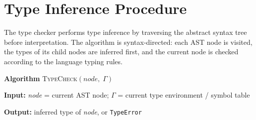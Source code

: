 \section{Type Inference Procedure}

The type checker performs type inference by traversing the abstract syntax tree
before interpretation. The algorithm is syntax-directed: each AST node is
visited, the types of its child nodes are inferred first, and the current node
is checked according to the language typing rules.

\begin{center}
\textbf{Algorithm} \textsc{TypeCheck}$(\textit{node},\; \Gamma)$
\end{center}

\noindent\textbf{Input:} \textit{node} = current AST node;\quad
$\Gamma$ = current type environment / symbol table

\noindent\textbf{Output:} inferred type of \textit{node}, or \texttt{TypeError}

